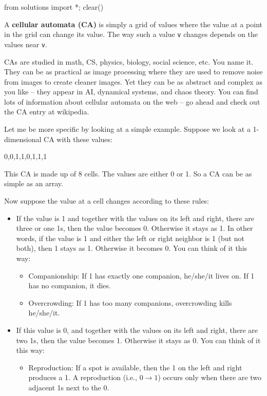 \begin{python0}
from solutions import *; clear()
\end{python0}

A \textbf{cellular automata (CA)} is simply a grid of values where the value at a point in the grid can change its value. The way such a value \verb!v! changes depends on the values near \verb!v!.

CAs are studied in math, CS, physics, biology, social science, etc. You name it. They can be as practical as image processing where they are used to remove noise from images to create cleaner images. Yet they can be as abstract and complex as you like -- they appear in AI, dynamical systems, and chaos theory. You can find lots of information about cellular automata on the web -- go ahead and check out the CA entry at wikipedia.

Let me be more specific by looking at a simple example. Suppose we look at a 1-dimensional CA with these values:
\begin{center}
0,0,1,1,0,1,1,1
\end{center}
This CA is made up of 8 cells. The values are either 0 or 1. So a CA can be as simple as an array.

Now suppose the value at a cell changes according to these rules:

\begin{itemize}
\item
  If the value is 1 and together with the values on its left and right,
  there are three or one 1s, then the value becomes 0. Otherwise it
  stays as 1. In other words, if the value is 1 and either the left or
  right neighbor is 1 (but not both), then 1 stays as 1. Otherwise it
  becomes 0. You can think of it this way:

  \begin{itemize}
  \item
    Companionship: If 1 has exactly one companion, he/she/it lives on.
    If 1 has no companion, it dies.
  \item
    Overcrowding: If 1 has too many companions, overcrowding kills
    he/she/it.
  \end{itemize}
\item
  If this value is 0, and together with the values on its left and
  right, there are two 1s, then the value becomes 1. Otherwise it stays
  as 0. You can think of it this way:

  \begin{itemize}
  \item
    Reproduction: If a spot is available, then the 1 on the left and
    right produces a 1. A reproduction (i.e., $0 \rightarrow 1$) occurs only when
    there are two adjacent 1s next to the 0.
  \end{itemize}
\end{itemize}

